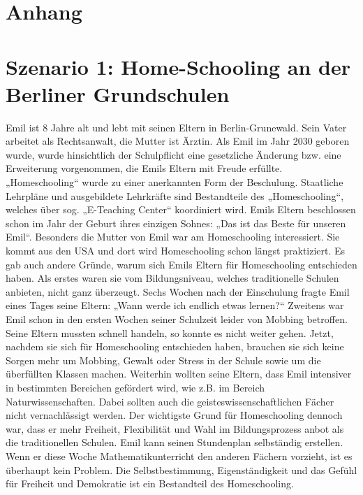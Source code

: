 \documentclass[12pt,a4paper]{article}
\begin{document}
\begin{appendix}
\section*{Anhang}
\normalsize
\section{Szenario 1: Home-Schooling an der Berliner Grundschulen}
Emil ist 8 Jahre alt und lebt mit seinen Eltern in Berlin-Grunewald. Sein Vater arbeitet als Rechtsanwalt, die Mutter ist Ärztin. Als Emil im Jahr 2030 geboren wurde, wurde hinsichtlich der Schulpflicht eine gesetzliche Änderung bzw. eine Erweiterung vorgenommen, die Emils Eltern mit Freude erfüllte. „Homeschooling“ wurde zu einer anerkannten Form der Beschulung. Staatliche Lehrpläne und ausgebildete Lehrkräfte sind Bestandteile des „Homeschooling“, welches über sog. „E-Teaching Center“ koordiniert wird. Emils Eltern beschlossen schon im Jahr der Geburt ihres einzigen Sohnes: „Das ist das Beste für unseren Emil“. Besonders die Mutter von Emil war am Homeschooling interessiert. Sie kommt aus den USA und dort wird Homeschooling schon längst praktiziert. Es gab auch andere Gründe, warum sich Emils Eltern für Homeschooling entschieden haben. Als erstes waren sie vom Bildungsniveau, welches traditionelle Schulen anbieten, nicht ganz überzeugt. Sechs Wochen nach der Einschulung fragte Emil eines Tages seine Eltern: „Wann werde ich endlich etwas lernen?“ Zweitens war Emil schon in den ersten Wochen seiner Schulzeit leider von Mobbing betroffen. Seine Eltern mussten schnell handeln, so konnte es nicht weiter gehen. Jetzt, nachdem sie sich für Homeschooling entschieden haben, brauchen sie sich keine Sorgen mehr um Mobbing, Gewalt oder Stress in der Schule sowie um die überfüllten Klassen machen. Weiterhin wollten seine Eltern, dass Emil intensiver in bestimmten Bereichen gefördert wird, wie z.B. im Bereich Naturwissenschaften. Dabei sollten auch die geisteswissenschaftlichen Fächer nicht vernachlässigt werden. Der wichtigste Grund für Homeschooling dennoch war, dass er mehr Freiheit, Flexibilität und Wahl im Bildungsprozess anbot als die traditionellen Schulen. Emil kann seinen Stundenplan selbständig erstellen. Wenn er diese Woche Mathematikunterricht den anderen Fächern vorzieht, ist es überhaupt kein Problem. Die Selbstbestimmung, Eigenständigkeit und das Gefühl für Freiheit und Demokratie ist ein Bestandteil des Homeschooling.

\end{appendix}
\end{document}
